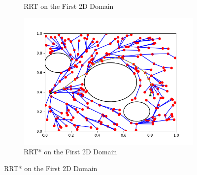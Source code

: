 \documentclass{article}
\begin{document}
\begin{enumerate}[(a)]
\begin{figure}[h!]
\begin{subfigure}{0.3\textwidth}
        \caption{RRT on the First 2D Domain}
    \end{subfigure}
    \hspace{0.05in}
    \begin{subfigure}{0.3\textwidth}
        \centering
        \includegraphics[width=\textwidth]{../figures/rrt_star_run1.png}
        \caption{RRT* on the First 2D Domain}
    \end{subfigure}
\end{figure}


\end{enumerate}
\end{document}
